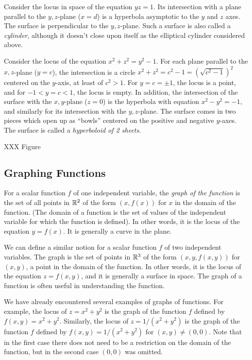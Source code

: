 \begin{example}
	Consider the locus in space of the equation $yz = 1$.   Its intersection
	with a plane parallel to the $y,z$-plane ($x = d$) is a hyperbola
	asymptotic to the $y$ and $z$ axes.  The surface is perpendicular
	to the $y,z$-plane.  Such a surface is also called a \emph{cylinder},
	although it doesn't close upon itself as the elliptical cylinder considered
	above.
\end{example}

\begin{example}
	Consider the locus of the equation $x^2 + z^2 = y^2 - 1$.  For
	each plane parallel to the $x,z$-plane ($y = c$), the intersection
	is a circle $x^2 + z^2 = c^2 - 1 = (\sqrt{c^2 - 1})^2$ centered
	on the $y$-axis, at least of $c^2 > 1$.  For $y = c = \pm 1$,
	the locus is a point, and for $-1 < y = c < 1$, the locus is
	empty.   In addition, the intersection of the surface with the
	$x,y$-plane ($z = 0$) is the hyperbola with equation $x^2 - y^2
	 = -1$, and similarly for its intersection with the $y,z$-plane.
	The surface comes in two pieces which open up as ``bowls'' centered
	on the positive and negative $y$-axes.   The surface is called
	a \emph{hyperboloid of 2 sheets}.    

	XXX Figure
\end{example}

\subsection{Graphing Functions}
For a scalar function $f$ of one independent variable, 
the \emph{graph of the function} is the set of
all points in $\mathbb{R}^2$  of the form  $(x, f(x))$
for $x$ in the domain of the function.   (The domain of a function
is the set of values of the independent variable for which the
function is defined).  In other words, it is the locus of the
equation $y = f(x)$.  It is generally a curve in the plane.

We can define a similar notion for a scalar function $f$ of two
independent variables.  The graph is the
set of points in $\mathbb{R}^3$  of the form $(x, y, f(x,y))$
for $(x,y)$, a point in the domain of the function.  In other words,
it is the locus of the equation $z = f(x,y)$, and it is generally
a surface in space.
The graph of a function is often useful in understanding the
function.

We have already encountered several examples of graphs of functions.
For example, the locus of $z = x^2 + y^2$ is the graph of the
function $f$ defined by $f(x,y) = x^2 +y^2$.   Similarly, the locus
of $z = 1/(x^2 + y^2)$ is the graph of the function $f$ defined by
$f(x,y) = 1/(x^2 + y^2)$ for $(x,y) \not= (0,0)$. 
  Note that in the first case there does not need to be a restriction on the domain of the function, but in the second
case $(0,0)$ was omitted.  

